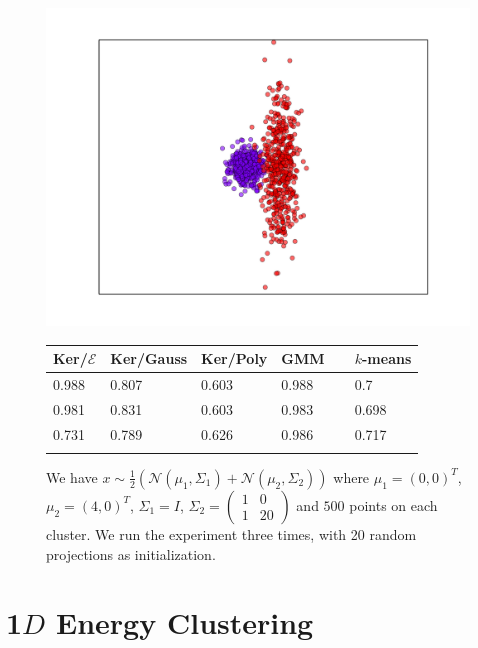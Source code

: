\documentclass[aps,preprint,nofootinbib,floatfix]{revtex4-1}
\begin{document}
\begin{figure}
\begin{minipage}{.49\textwidth}
\includegraphics[scale=.45]{blob_cigar.pdf}
\end{minipage}
\begin{minipage}{.49\textwidth}
\begin{tabular}{ l l l l l}
\hline
Ker/$\mathcal{E}$ & Ker/Gauss & Ker/Poly & GMM~~ & $k$-means \\
\hline
0.988 &
0.807 &
0.603 &
0.988 & 
0.7 \\
0.981 & 
0.831 &
0.603 &
0.983 & 
0.698 \\
0.731 & 
0.789 &
0.626 & 
0.986 &
0.717 \\
\\
\hline
\end{tabular}
\end{minipage}
\caption{\label{fig:weird1}
We have $x \sim \tfrac{1}{2}\left( \mathcal{N}(\mu_1, \Sigma_1) +
\mathcal{N}(\mu_2, \Sigma_2)\right)$ where $\mu_1 = (0,0)^T$, $\mu_2=(4,0)^T$,
$\Sigma_1 = I$, 
$\Sigma_2 = \left( \begin{smallmatrix} 
1 & 0 \\ 1 & 20
\end{smallmatrix}\right)$
and $500$ points on each cluster. We run the experiment three times,
with 20 random projections as initialization.
}
\end{figure}


\clearpage

\section{1$D$ Energy Clustering}
\end{document}
